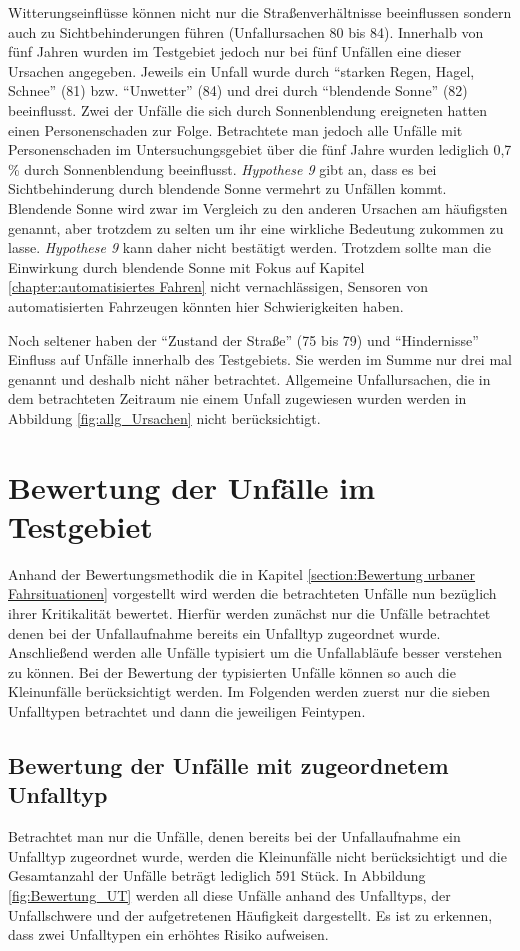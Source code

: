Witterungseinflüsse können nicht nur die Straßenverhältnisse beeinflussen sondern auch zu Sichtbehinderungen führen (Unfallursachen 80 bis 84). Innerhalb von fünf Jahren wurden im Testgebiet jedoch nur bei fünf Unfällen eine dieser Ursachen angegeben. Jeweils ein Unfall wurde durch \enquote{starken Regen, Hagel, Schnee} (81) bzw. \enquote{Unwetter} (84) und drei durch \enquote{blendende Sonne} (82) beeinflusst. Zwei der Unfälle die sich durch Sonnenblendung ereigneten hatten einen Personenschaden zur Folge. Betrachtete man jedoch alle Unfälle mit Personenschaden im Untersuchungsgebiet über die fünf Jahre wurden lediglich 0,7 \% durch Sonnenblendung beeinflusst. \textit{Hypothese 9} gibt an, dass es bei Sichtbehinderung durch blendende Sonne vermehrt zu Unfällen kommt. Blendende Sonne wird zwar im Vergleich zu den anderen Ursachen am häufigsten genannt, aber trotzdem zu selten um ihr eine wirkliche Bedeutung zukommen zu lasse. \textit{Hypothese 9} kann daher nicht bestätigt werden. Trotzdem sollte man die Einwirkung durch blendende Sonne mit Fokus auf Kapitel \ref{chapter:automatisiertes Fahren} nicht vernachlässigen, Sensoren von automatisierten Fahrzeugen könnten hier Schwierigkeiten haben.
 
Noch seltener haben der \enquote{Zustand der Straße} (75 bis 79) und \enquote{Hindernisse} Einfluss auf Unfälle innerhalb des Testgebiets. Sie werden im Summe nur drei mal genannt und deshalb nicht näher betrachtet. Allgemeine Unfallursachen, die in dem betrachteten Zeitraum nie einem Unfall zugewiesen wurden werden in Abbildung \ref{fig:allg_Ursachen} nicht berücksichtigt.


\section{Bewertung der Unfälle im Testgebiet}
Anhand der Bewertungsmethodik die in Kapitel \ref{section:Bewertung urbaner Fahrsituationen} vorgestellt wird werden die betrachteten Unfälle nun bezüglich ihrer Kritikalität bewertet. Hierfür werden zunächst nur die Unfälle betrachtet denen bei der Unfallaufnahme bereits ein Unfalltyp zugeordnet wurde. Anschließend werden alle Unfälle typisiert um die Unfallabläufe besser verstehen zu können. Bei der Bewertung der typisierten Unfälle können so auch die Kleinunfälle berücksichtigt werden. Im Folgenden werden zuerst nur die sieben Unfalltypen betrachtet und dann die jeweiligen Feintypen.

\subsection{Bewertung der Unfälle mit zugeordnetem Unfalltyp}
Betrachtet man nur die Unfälle, denen bereits bei der Unfallaufnahme ein Unfalltyp zugeordnet wurde, werden die Kleinunfälle nicht berücksichtigt und die Gesamtanzahl der Unfälle beträgt lediglich 591 Stück. In Abbildung \ref{fig:Bewertung_UT} werden all diese Unfälle anhand des Unfalltyps, der Unfallschwere und der aufgetretenen Häufigkeit dargestellt. Es ist zu erkennen, dass zwei Unfalltypen ein erhöhtes Risiko aufweisen.

